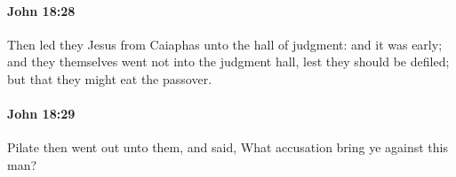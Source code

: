 		\paragraph{John 18:28} %
			\label{JOHN-18-28}

			Then led they Jesus from Caiaphas unto the hall of judgment: and it was early; and they themselves went not into the judgment hall, lest they should be defiled; but that they might eat the passover.

			\begin{framed}
				\scriptsize
				\begin{compactdesc}
					\item[SBLG] 
				\end{compactdesc}
			\end{framed}

		\paragraph{John 18:29} %
			\label{JOHN-18-29}

			Pilate then went out unto them, and said, What accusation bring ye against this man?

